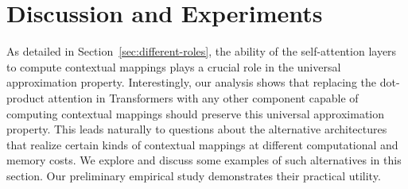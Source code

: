 \documentclass{article} %
\begin{document}
\section{Discussion and Experiments}\label{sec:discussion}
\vspace*{-4pt}
As detailed in Section~\ref{sec:different-roles}, the ability of the self-attention layers to compute contextual mappings plays a crucial role in the universal approximation property. Interestingly, our analysis shows that replacing the dot-product attention in Transformers with any other component capable of computing contextual mappings should preserve this universal approximation property. This leads naturally to questions about the alternative architectures that realize certain kinds of contextual mappings at different computational and memory costs. 
We explore and discuss some examples of such alternatives in this section.
Our preliminary empirical study demonstrates their practical utility.


\vspace*{-5pt}
\end{document}
